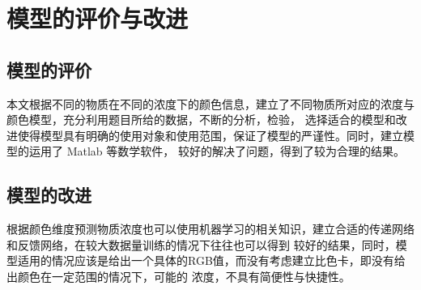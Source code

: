 \section{模型的评价与改进}
\subsection{模型的评价}
本文根据不同的物质在不同的浓度下的颜色信息，建立了不同物质所对应的浓度与颜色模型，充分利用题目所给的数据，不断的分析，检验，
选择适合的模型和改进使得模型具有明确的使用对象和使用范围，保证了模型的严谨性。同时，建立模型的运用了 Matlab 等数学软件，
较好的解决了问题，得到了较为合理的结果。
\subsection{模型的改进}
根据颜色维度预测物质浓度也可以使用机器学习的相关知识，建立合适的传递网络和反馈网络，在较大数据量训练的情况下往往也可以得到
较好的结果，同时，模型适用的情况应该是给出一个具体的RGB值，而没有考虑建立比色卡，即没有给出颜色在一定范围的情况下，可能的
浓度，不具有简便性与快捷性。
